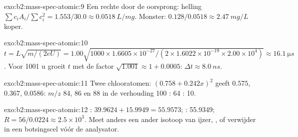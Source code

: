 \begin{solution}{exo:b2:mass-spec-atomic:9}
Een rechte door de oorsprong: helling $\sum c_iA_i/\sum c_i^2 = 1.553/30.0 \approx \qty{0.0518}{L/mg}$. Monster:
$0.128/0.0518 \approx \qty{2.47}{mg/L}$ koper.
\end{solution}

\begin{solution}{exo:b2:mass-spec-atomic:10}
$t = L\sqrt{m/(2eU)} = 1.00\sqrt{1000 \times 1.6605 \times 10^{-27}/(2 \times 1.6022 \times 10^{-19}
\times 2.00 \times 10^4)} \approx \qty{16.1}{\micro s}$. Voor 1001 u groeit $t$ met de factor
$\sqrt{1.001} \approx 1 + 0.0005$: $\Delta t \approx \qty{8.0}{ns}$.
\end{solution}

\begin{solution}{exo:b2:mass-spec-atomic:11}
Twee chlooratomen: $(0.758 + 0.242x)^2$ geeft $0.575$, $0.367$, $0.0586$: $m/z$ 84, 86 en 88 in de verhouding
100 : 64 : 10.
\end{solution}

\begin{solution}{exo:b2:mass-spec-atomic:12}
: $39.9624 + 15.9949 = 55.9573$; : 55.9349; $R = 56/0.0224 \approx 2.5 \times
10^3$. Meet anders een ander isotoop van ijzer, , of verwijder  in een botsingscel
vóór de analysator.
\end{solution}

